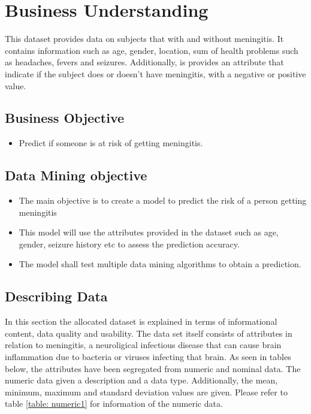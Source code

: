 
\section*{Business Understanding}
This dataset provides data on subjects that with and without meningitis. It contains information such as age, gender, location, sum of health problems such as headaches, fevers and seizures. Additionally, is provides an attribute that indicate if the subject does or doesn't have meningitis, with a negative or positive value. 

\subsection*{Business Objective}

\begin{itemize}
	\item  Predict if someone is at risk of getting meningitis.
\end{itemize}

\subsection*{Data Mining objective}
\begin{itemize}
	\item The main objective is to create a model to predict the risk of a person getting meningitis 
	\item This model will use the attributes provided in the dataset such as age, gender, seizure history etc to assess the prediction accuracy.
	\item The model shall test multiple data mining algorithms to obtain a prediction.
\end{itemize}





\subsection*{Describing Data}
In this section the allocated dataset is explained in terms of informational content, data quality and usability. The data set itself consists of attributes in relation to meningitis, a neuroligical infectious disease that can cause brain inflammation due to bacteria or viruses infecting that brain. As seen in tables below, the attributes have been segregated from numeric and nominal data. The numeric data given a description and a data type. Additionally, the mean, minimum, maximum and standard deviation values are given. Please refer to table \ref{table: numeric1} for information of the numeric data.


